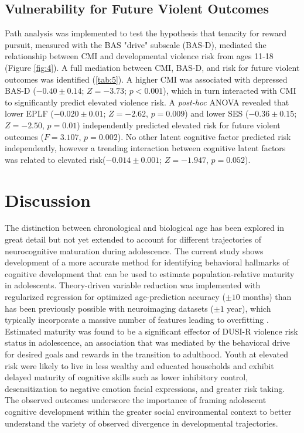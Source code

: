 \documentclass[utf8]{stylesheet}
\begin{document}
\subsection{Vulnerability for Future Violent Outcomes} Path analysis was implemented to test the hypothesis that tenacity for reward pursuit, measured with the BAS "drive" subscale (BAS-D), mediated the relationship between CMI and developmental violence risk from ages 11-18 (Figure \ref{fig:4}). A full mediation between CMI, BAS-D, and risk for future violent outcomes was identified (\ref{tab:5}). A higher CMI was associated with depressed BAS-D ($-0.40\pm0.14$; $Z=-3.73$; $p<0.001$), which in turn interacted with CMI to significantly predict elevated violence risk. A \textit{post-hoc} ANOVA revealed that lower EPLF ($-0.020\pm0.01$; $Z=-2.62$, $p=0.009$) and lower SES ($-0.36\pm0.15$; $Z=-2.50$, $p=0.01$) independently predicted elevated risk for future violent outcomes ($F=3.107$, $p=0.002$). No other latent cognitive factor predicted risk independently, however a trending interaction between cognitive latent factors was related to elevated risk($-0.014\pm0.001$; $Z=-1.947$,  $p=0.052$).
\\
\section{Discussion} The distinction between chronological and biological age has been explored in great detail but not yet extended to account for different trajectories of neurocognitive maturation during adolescence. The current study shows development of a more accurate method for identifying behavioral hallmarks of cognitive development that can be used to estimate population-relative maturity in adolescents. Theory-driven variable reduction was implemented with regularized regression for optimized age-prediction accuracy ($\pm 10$ months) than has been previously possible with neuroimaging datasets ($\pm1$ year), which typically incorporate a massive number of features leading to overfitting \citep{cole2017predicting, franke2012brain}. Estimated maturity was found to be a significant effector of DUSI-R violence risk status in adolescence, an association that was mediated by the behavioral drive for desired goals and rewards in the transition to adulthood. Youth at elevated risk were likely to live in less wealthy and educated households and exhibit delayed maturity of cognitive skills such as lower inhibitory control, desensitization to negative emotion facial expressions, and greater risk taking. The observed outcomes underscore the importance of framing adolescent cognitive development within the greater social environmental context to better understand the variety of observed divergence in developmental trajectories.
\vspace{4pt}
\end{document}
